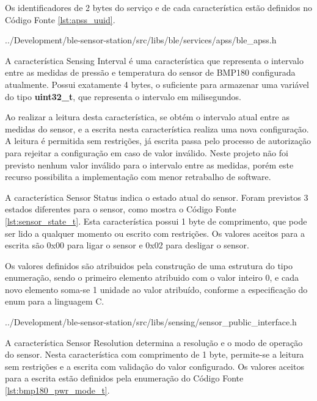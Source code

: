 Os identificadores de 2 bytes do serviço e de cada característica estão
definidos no Código Fonte \ref{lst:apss_uuid}. 

\begin{minipage}{0.95\linewidth}

{../Development/ble-sensor-station/src/libs/ble/services/apss/ble_apss.h}
\end{minipage}

A característica Sensing Interval é uma característica que representa o
intervalo entre as medidas de pressão e temperatura do sensor de BMP180
configurada atualmente. Possui exatamente 4 bytes, o suficiente para armazenar
uma variável do tipo \textbf{uint32\_t}, que representa o intervalo em
milisegundos.

Ao realizar a leitura desta característica, se obtém o intervalo atual entre as
medidas do sensor, e a escrita nesta característica realiza uma nova
configuração. A leitura é permitida sem restrições, já escrita passa pelo
processo de autorização para rejeitar a configuração em caso de valor
inválido. Neste projeto não foi previsto nenhum valor inválido para o intervalo
entre as medidas, porém este recurso possibilita a implementação com menor
retrabalho de software.

A característica Sensor Status indica o estado atual do sensor. Foram previstos
3 estados diferentes para o sensor, como mostra o Código Fonte
\ref{lst:sensor_state_t}. Esta característica possui 1 byte de comprimento, que
pode ser lido a qualquer momento ou escrito com restrições. Os valores aceitos
para a escrita são 0x00 para ligar o sensor e 0x02 para
desligar o sensor.

Os valores definidos são atribuidos pela construção de uma estrutura do tipo
enumeração, sendo o primeiro elemento atribuido com o valor inteiro 0, e
cada novo elemento soma-se 1 unidade ao valor atribuído, conforme
a especificação do enum para a linguagem C.\cite{C99Spec}

\begin{minipage}{0.95\linewidth}

{../Development/ble-sensor-station/src/libs/sensing/sensor_public_interface.h}
\end{minipage}

A característica Sensor Resolution determina a resolução e o modo de operação do
sensor. Nesta característica com comprimento de 1 byte, permite-se a leitura sem
restrições e a escrita com validação do valor configurado. Os valores aceitos
para a escrita estão definidos pela enumeração do Código Fonte \ref{lst:bmp180_pwr_mode_t}.
\cite{BMP180Datasheet}


